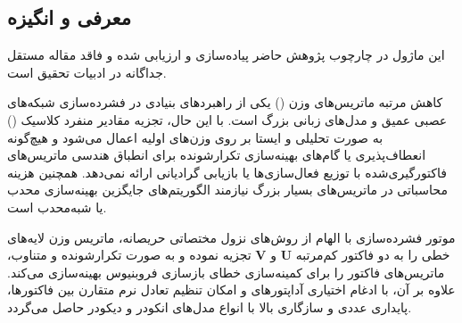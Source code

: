 \subsection{معرفی و انگیزه}
این ماژول در چارچوب پژوهش حاضر پیاده‌سازی و ارزیابی شده و فاقد مقاله مستقل جداگانه در ادبیات تحقیق است.

کاهش مرتبه ماتریس‌های وزن () یکی از راهبردهای بنیادی در فشرده‌سازی شبکه‌های عصبی عمیق و مدل‌های زبانی بزرگ است. با این حال، تجزیه مقادیر منفرد کلاسیک () به صورت تحلیلی و ایستا بر روی وزن‌های اولیه اعمال می‌شود و هیچ‌گونه انعطاف‌پذیری یا گام‌های بهینه‌سازی تکرارشونده برای انطباق هندسی ماتریس‌های فاکتورگیری‌شده با توزیع فعال‌سازی‌ها یا بازیابی گرادیانی ارائه نمی‌دهد. همچنین هزینه محاسباتی  در ماتریس‌های بسیار بزرگ نیازمند الگوریتم‌های جایگزین بهینه‌سازی محدب یا شبه‌محدب است.

موتور فشرده‌سازی  با الهام از روش‌های نزول مختصاتی حریصانه، ماتریس وزن لایه‌های خطی را به دو فاکتور کم‌مرتبه $\mathbf{U}$ و $\mathbf{V}$ تجزیه نموده و به صورت تکرارشونده و متناوب، ماتریس‌های فاکتور را برای کمینه‌سازی خطای بازسازی فروبنیوس بهینه‌سازی می‌کند. علاوه بر آن، با ادغام اختیاری آداپتورهای  و امکان تنظیم تعادل نرم متقارن بین فاکتورها، پایداری عددی و سازگاری بالا با انواع مدل‌های انکودر و دیکودر حاصل می‌گردد.
